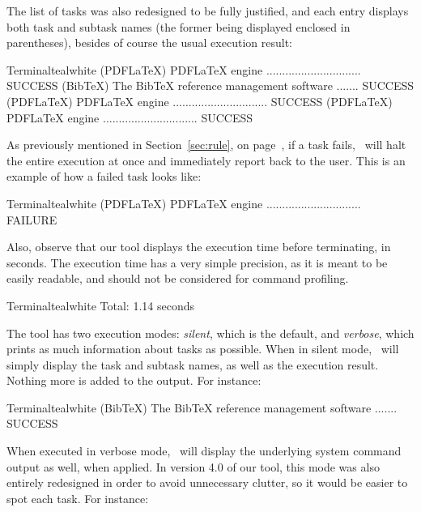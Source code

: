 The list of tasks was also redesigned to be fully justified, and each entry displays both task and subtask names (the former being displayed enclosed in parentheses), besides of course the usual execution result:

\begin{codebox}{Terminal}{teal}{\icnote}{white}
(PDFLaTeX) PDFLaTeX engine .............................. SUCCESS
(BibTeX) The BibTeX reference management software ....... SUCCESS
(PDFLaTeX) PDFLaTeX engine .............................. SUCCESS
(PDFLaTeX) PDFLaTeX engine .............................. SUCCESS
\end{codebox}

As previously mentioned in Section~\ref{sec:rule}, on page~\pageref{sec:rule}, if a task fails, \arara\ will halt the entire execution at once and immediately report back to the user. This is an example of how a failed task looks like:

\begin{codebox}{Terminal}{teal}{\icnote}{white}
(PDFLaTeX) PDFLaTeX engine .............................. FAILURE
\end{codebox}

Also, observe that our tool displays the execution time before terminating, in seconds. The execution time has a very simple precision, as it is meant to be easily readable, and should not be considered for command profiling.

\begin{codebox}{Terminal}{teal}{\icnote}{white}
Total: 1.14 seconds
\end{codebox}

The tool has two execution modes: \emph{silent}, which is the default, and \emph{verbose}, which prints as much information about tasks as possible. When in silent mode, \arara\ will simply display the task and subtask names, as well as the execution result. Nothing more is added to the output. For instance:

\begin{codebox}{Terminal}{teal}{\icnote}{white}
(BibTeX) The BibTeX reference management software ....... SUCCESS
\end{codebox}

When executed in verbose mode, \arara\ will display the underlying system command output as well, when applied. In version 4.0 of our tool, this mode was also entirely redesigned in order to avoid unnecessary clutter, so it would be easier to spot each task. For instance:

